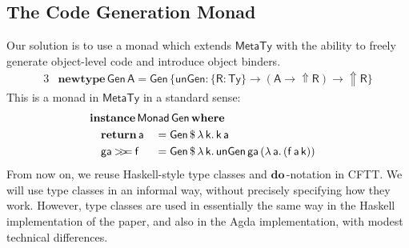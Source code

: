\documentclass[acmsmall,screen,review,anonymous]{acmart}
\newcommand{\mit}[1]{{\mathsf{#1}}}
\newcommand{\msf}[1]{{\mathsf{#1}}}
\newcommand{\mbf}[1]{{\mathbf{#1}}}
\newcommand{\mdo}{\mbf{do}\,}
\newcommand{\ind}{\hspace{1em}}
\newcommand{\return}{\mbf{return}\,}
\newcommand{\lam}{\lambda\,}
\newcommand{\where}{\mbf{where}}
\newcommand{\vk}{\mathsf{k}}
\newcommand{\vA}{\mathsf{A}}
\newcommand{\vR}{\mathsf{R}}
\newcommand{\va}{\mathsf{a}}
\newcommand{\vf}{\mathsf{f}}
\newcommand{\Monad}{\msf{Monad}}
\newcommand{\Up}{{\Uparrow}}
\newcommand{\bind}{\mathbin{>\!\!>\mkern-6.7mu=}}
\newcommand{\MTy}{\msf{MetaTy}}
\newcommand{\Ty}{\msf{Ty}}
\theoremstyle{remark}
\newcommand{\instance}{\mbf{instance}\,}
\newcommand{\Gen}{\msf{Gen}}
\newcommand{\unGen}{\mit{unGen}}
\newcommand{\newtype}{\mbf{newtype}\,}
\newcommand{\dlr}{\,\$\,}
\begin{document}
\subsection{The Code Generation Monad}\label{sec:the-code-generation-monad}

Our solution is to use a monad which extends $\MTy$ with the ability to
freely generate object-level code and introduce object binders.
\begin{alignat*}{3}
  & \newtype \Gen\,\vA = \Gen\,\{\unGen : \{\vR : \Ty\} \to (\vA \to \Up \vR) \to \Up \vR\}
\end{alignat*}
This is a monad in $\MTy$ in a standard sense:
\begin{alignat*}{3}
  &\mathrlap{\instance \Monad\,\Gen\,\where}\\
  &\ind \return \va        &&= \Gen \dlr \lam \vk.\,\vk\,\va\\
  &\ind \mit{ga} \bind \vf &&= \Gen \dlr \lam \vk.\,\unGen\,\mit{ga}\,(\lam \va.\,(\vf\,\va\,\vk))
\end{alignat*}
From now on, we reuse Haskell-style type classes and $\mdo$-notation in CFTT.
We will use type classes in an informal way, without precisely specifying how
they work. However, type classes are used in essentially the same way in the
Haskell implementation of the paper, and also in the Agda implementation, with
modest technical differences.
\end{document}
